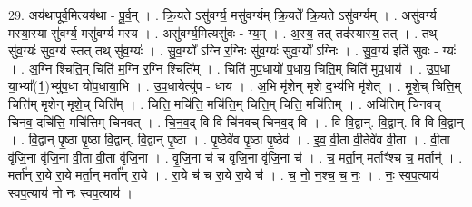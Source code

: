 \documentclass[17pt]{extarticle}
\begin{document}
29. अय॑थापूर्व॒मित्यय॑था - पू॒र्व॒म् । . क्रि॒यते ऽसु॑वर्ग्य॒ मसु॑वर्ग्यम् क्रि॒यते᳚ क्रि॒यते ऽसु॑वर्ग्यम् । . असु॑वर्ग्य मस्या॒स्या सु॑वर्ग्य॒ मसु॑वर्ग्य मस्य । . असु॑वर्ग्य॒मित्यसु॑वः - ग्य॒म् । . अ॒स्य॒ तत् तद॑स्यास्य॒ तत् । . तथ् सु॑व॒ग्यः॑ सुव॒ग्य॑ स्तत् तथ् सु॑व॒ग्यः॑ । . सु॒व॒ग्यो᳚ ऽग्नि र॒ग्निः सु॑व॒ग्यः॑ सुव॒ग्यो᳚ ऽग्निः । . सु॒व॒ग्य॑ इति॑ सुवः - ग्यः॑ । . अ॒ग्नि श्चिति॒म् चिति॑ म॒ग्नि र॒ग्नि श्चिति᳚म् । . चिति॑ मुप॒धायो॑ प॒धाय॒ चिति॒म् चिति॑ मुप॒धाय॑ । . उ॒प॒धा या॒भ्या᳚(1॒)भ्यु॑प॒धा यो॑प॒धाया॒भि । . उ॒प॒धायेत्यु॑प - धाय॑ । . अ॒भि मृ॑शेन् मृशे द॒भ्य॑भि मृ॑शेत् । . मृ॒शे॒च् चित्ति॒म् चित्ति॑म् मृशेन् मृशे॒च् चित्ति᳚म् । . चित्ति॒ मचि॑त्ति॒ मचि॑त्ति॒म् चित्ति॒म् चित्ति॒ मचि॑त्तिम् । . अचि॑त्तिम् चिनवच् चिनव॒ दचि॑त्ति॒ मचि॑त्तिम् चिनवत् । . चि॒न॒व॒द् वि वि चि॑नवच् चिनव॒द् वि । . वि वि॒द्वान्. वि॒द्वान्. वि वि वि॒द्वान् । . वि॒द्वान् पृ॒ष्ठा पृ॒ष्ठा वि॒द्वान्. वि॒द्वान् पृ॒ष्ठा । . पृ॒ष्ठेवे॑व पृ॒ष्ठा पृ॒ष्ठेव॑ । . इ॒व॒ वी॒ता वी॒तेवे॑व वी॒ता । . वी॒ता वृ॑जि॒ना वृ॑जि॒ना वी॒ता वी॒ता वृ॑जि॒ना । . वृ॒जि॒ना च॑ च वृजि॒ना वृ॑जि॒ना च॑ । . च॒ मर्ता॒न् मर्ताꣳ॑श्च च॒ मर्तान्॑ । . मर्ता᳚न् रा॒ये रा॒ये मर्ता॒न् मर्ता᳚न् रा॒ये । . रा॒ये च॑ च रा॒ये रा॒ये च॑ । . च॒ नो॒ न॒श्च॒ च॒ नः॒ । . नः॒ स्व॒प॒त्याय॑ स्वप॒त्याय॑ नो नः स्वप॒त्याय॑ । \newline
\end{document}
